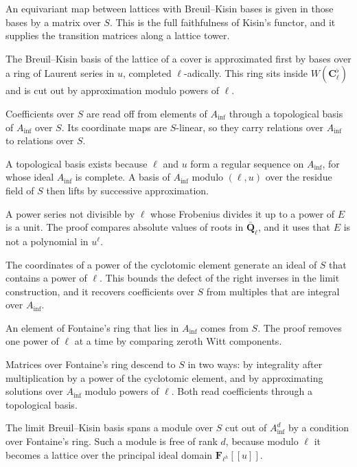 An equivariant map between lattices with Breuil--Kisin bases is given in those bases by a matrix over
$S$. This is the full faithfulness of Kisin's functor, and it supplies the transition matrices along a
lattice tower.

The Breuil--Kisin basis of the lattice of a cover is approximated first by bases over a ring of Laurent series
in $u$, completed $\ell$-adically. This ring sits inside $W(\mathbf C_\ell^\flat)$ and is cut out by approximation
modulo powers of $\ell$.

Coefficients over $S$ are read off from elements of $A_{\inf}$ through a topological basis of $A_{\inf}$ over $S$.
Its coordinate maps are $S$-linear, so they carry relations over $A_{\inf}$ to relations over $S$.

A topological basis exists because $\ell$ and $u$ form a regular sequence on $A_{\inf}$, for whose ideal $A_{\inf}$
is complete. A basis of $A_{\inf}$ modulo $(\ell,u)$ over the residue field of $S$ then lifts by successive
approximation.

A power series not divisible by $\ell$ whose Frobenius divides it up to a power of $E$ is a unit. The proof
compares absolute values of roots in $\bar{\mathbf Q}_\ell$, and it uses that $E$ is not a polynomial in
$u^\ell$.

The coordinates of a power of the cyclotomic element generate an ideal of $S$ that contains a power of $\ell$.
This bounds the defect of the right inverses in the limit construction, and it recovers coefficients over $S$
from multiples that are integral over $A_{\inf}$.

An element of Fontaine's ring that lies in $A_{\inf}$ comes from $S$. The proof removes one power of $\ell$ at a
time by comparing zeroth Witt components.

Matrices over Fontaine's ring descend to $S$ in two ways: by integrality after multiplication by a power of the
cyclotomic element, and by approximating solutions over $A_{\inf}$ modulo powers of $\ell$. Both read coefficients
through a topological basis.

The limit Breuil--Kisin basis spans a module over $S$ cut out of $A_{\inf}^d$ by a condition over Fontaine's ring.
Such a module is free of rank $d$, because modulo $\ell$ it becomes a lattice over the principal ideal domain
$\mathbf F_{\ell^h}[[u]]$.

